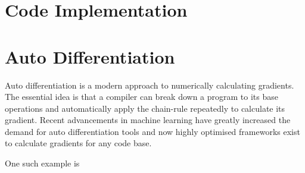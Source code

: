 \documentclass[11pt]{article}
\begin{document}
    \section{Code Implementation}\label{sec:code_implementation}

    \section{Auto Differentiation}\label{sec:autodiff}
    Auto differentiation is a modern approach to numerically calculating gradients.
    The essential idea is that a compiler can break down a program to its base operations and automatically apply the
    chain-rule repeatedly to calculate its gradient.
    Recent advancements in machine learning have greatly increased the demand for auto differentiation tools and now
    highly optimised frameworks exist to calculate gradients for any code base.

    One such example is
\end{document}
